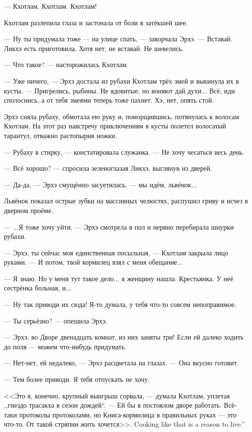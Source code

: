 \asterism

--- Кхотлам.
Кхотлам.
Кхотлам!

Кхотлам разлепила глаза и застонала от боли в затёкшей шее.

--- Ну ты придумала тоже --- на улице спать, --- заворчала Эрхэ.
--- Вставай.
Ликхэ есть приготовила.
Хотя нет, не вставай.
Не шевелись.

--- Что такое? --- насторожилась Кхотлам.

--- Уже ничего, --- Эрхэ достала из рубахи Кхотлам трёх змей и выкинула их в кусты.
--- Пригрелись, рыбины.
Не ядовитые, но воняют дай духи...
Всё, иди сполоснись, а от тебя змеями теперь тоже пахнет.
Хэ, нет, опять стой.

Эрхэ сняла рубаху, обмотала ею руку и, поморщившись, потянулась к волосам Кхотлам.
На этот раз навстречу приключениям в кусты полетел волосатый тарантул, отважно растопырив ножки.

--- Рубаху в стирку, --- констатировала служанка.
--- Не хочу чесаться весь день.

--- Всё хорошо? --- спросила зеленоглазая Ликхэ, выглянув из дверей.

--- Да-да, --- Эрхэ смущённо засуетилась, --- мы идём, львёнок...

Львёнок показал острые зубки на массивных челюстях, распушил гриву и исчез в дверном проёме.

--- ...Я тоже хочу уйти, --- Эрхэ смотрела в пол и нервно перебирала шнурки рубахи.

--- Эрхэ, ты сейчас моя единственная посыльная, --- Кхотлам закрыла лицо руками.
--- И потом, твой кормилец взял с меня обещание...

--- Я знаю.
Но у меня тут такое дело... я женщину нашла.
Крестьянка.
У неё сестрёнка больная, и...

--- Ну так приводи их сюда!
Я-то думала, у тебя что-то совсем непоправимое.

--- Ты серьёзно? --- опешила Эрхэ.

--- Эрхэ, во Дворе двенадцать комнат, из них заняты три!
Если ей далеко ходить до поля --- можем что-нибудь придумать.

--- Нет-нет, ей недалеко, --- Эрхэ расцветала на глазах.
--- Она вкусно готовит.

--- Тем более приводи.
Я тебя отпускать не хочу.

<<Это я, конечно, крупный выигрыш сорвала, --- думала Кхотлам, уплетая ,,гнездо трасакха в сезон дождей``.
--- Ей бы в постоялом дворе работать.
Всё-таки протоколы протоколами, но Книга-кормилица в правильных руках --- это что-то.
{От такой стряпни жить хочется>>.}
{Cooking like that is a reason to live.''}

